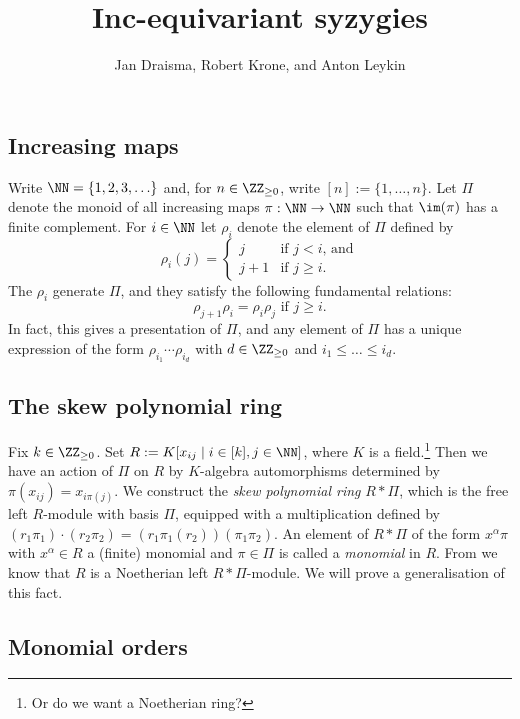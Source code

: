 \documentclass{amsart}
\begin{document}
\title{Inc-equivariant syzygies}
\author{Jan Draisma, Robert Krone, and Anton Leykin}
\maketitle

\subsection*{Increasing maps}

Write $\NN=\{1,2,3,\ldots\}$ and, for $n \in \ZZ_{\geq 0}$, write
$[n]:=\{1,\ldots,n\}$. Let $\Pi$ denote the monoid of all increasing maps
$\pi:\NN \to \NN$ such that $\im(\pi)$ has a finite complement. For $i
\in \NN$ let $\rho_i$ denote the element of $\Pi$ defined by
\[ \rho_i(j)=
\begin{cases} 
	j & \text{if $j<i$, and}\\
	j+1 & \text{if $j \geq i$.}
\end{cases}
\]
The $\rho_i$ generate $\Pi$, and they satisfy the following fundamental
relations:
\[ \rho_{j+1}\rho_i=\rho_i \rho_j \text{ if }j \geq i. \]
In fact, this gives a presentation of $\Pi$, and any element of $\Pi$
has a unique expression of the form $\rho_{i_1} \cdots \rho_{i_d}$
with $d \in \ZZ_{\geq 0}$ and $i_1 \leq \ldots \leq i_d$.

\subsection*{The skew polynomial ring}

Fix $k \in \ZZ_{\geq 0}$. Set $R:=K[x_{ij} \mid i \in [k], j \in \NN]$,
where $K$ is a field.\footnote{Or do we want a Noetherian ring?}
Then we have an action of $\Pi$ on $R$ by $K$-algebra automorphisms
determined by $\pi(x_{ij})=x_{i\pi(j)}$. We construct the {\em skew
polynomial ring} $R*\Pi$, which is the free left $R$-module with basis
$\Pi$, equipped with a multiplication defined by $(r_1 \pi_1)\cdot(r_2
\pi_2)=(r_1\pi_1(r_2))(\pi_1\pi_2)$. An element of $R*\Pi$ of the form
$x^{\alpha} \pi$ with $x^\alpha \in R$ a (finite) monomial and $\pi \in
\Pi$ is called a {\em monomial} in $R$. From \cite{} we know that $R$
is a Noetherian left $R*\Pi$-module. We will prove a generalisation of
this fact.

\subsection*{Monomial orders}
\end{document}
